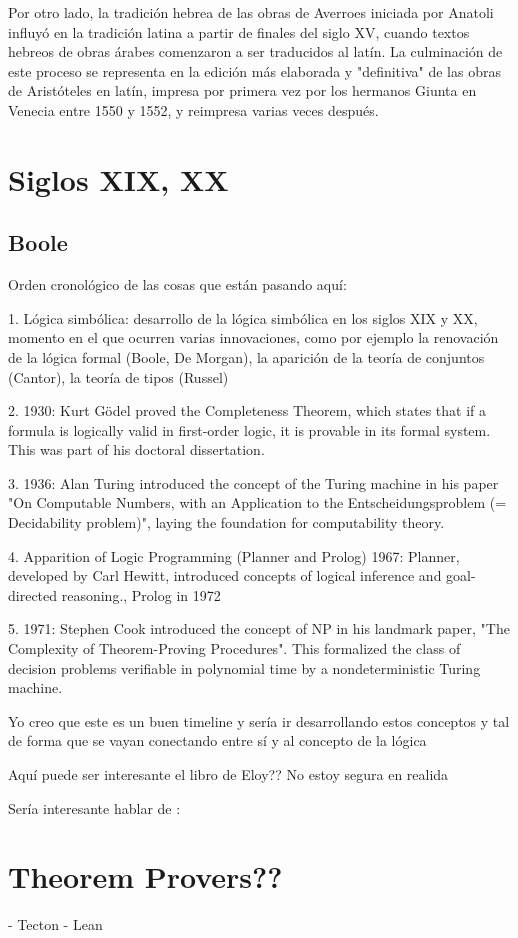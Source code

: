 \documentclass{article}
\begin{document}
Por otro lado, la tradición hebrea de las obras de Averroes iniciada por Anatoli influyó en la tradición latina a partir de finales del siglo XV, cuando textos hebreos de obras árabes comenzaron a ser traducidos al latín. La culminación de este proceso se representa en la edición más elaborada y "definitiva" de las obras de Aristóteles en latín, impresa por primera vez por los hermanos Giunta en Venecia entre 1550 y 1552, y reimpresa varias veces después\cite{charles2004latin}.


\section{Siglos XIX, XX}

\subsection{Boole}

Orden cronológico de las cosas que están pasando aquí:

1. Lógica simbólica: desarrollo de la
lógica simbólica en los siglos XIX y XX, momento en el que ocurren varias
innovaciones, como por ejemplo la renovación de la lógica formal (Boole, De
Morgan), la aparición de la teoría de conjuntos (Cantor), la teoría de tipos
(Russel)

2. 1930: Kurt Gödel proved the Completeness Theorem, which states that if a formula is logically valid in first-order logic, it is provable in its formal system. This was part of his doctoral dissertation.

3. 1936: Alan Turing introduced the concept of the Turing machine in his paper "On Computable Numbers, with an Application to the Entscheidungsproblem (= Decidability problem)", laying the foundation for computability theory.

4. Apparition of Logic Programming (Planner and Prolog) 
1967: Planner, developed by Carl Hewitt, introduced concepts of logical inference and goal-directed reasoning., Prolog in 1972

5. 1971: Stephen Cook introduced the concept of NP in his landmark paper, "The Complexity of Theorem-Proving Procedures". This formalized the class of decision problems verifiable in polynomial time by a nondeterministic Turing machine.

Yo creo que este es un buen timeline y sería ir desarrollando estos conceptos y tal de forma que se vayan conectando entre sí y al concepto de la lógica



Aquí puede ser interesante el libro de Eloy?? No estoy segura en realida

Sería interesante hablar de :


\section{Theorem Provers??}
- Tecton
- Lean



\renewcommand{\refname}{Referencias}


\end{document}
